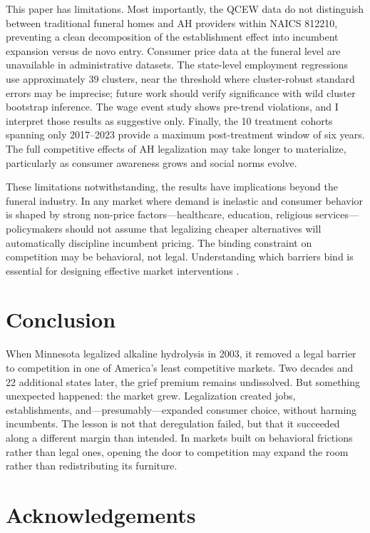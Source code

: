 \documentclass[12pt]{article}
\begin{document}
This paper has limitations. Most importantly, the QCEW data do not distinguish between traditional funeral homes and AH providers within NAICS 812210, preventing a clean decomposition of the establishment effect into incumbent expansion versus de novo entry. Consumer price data at the funeral level are unavailable in administrative datasets. The state-level employment regressions use approximately 39 clusters, near the threshold where cluster-robust standard errors may be imprecise; future work should verify significance with wild cluster bootstrap inference. The wage event study shows pre-trend violations, and I interpret those results as suggestive only. Finally, the 10 treatment cohorts spanning only 2017--2023 provide a maximum post-treatment window of six years. The full competitive effects of AH legalization may take longer to materialize, particularly as consumer awareness grows and social norms evolve.

These limitations notwithstanding, the results have implications beyond the funeral industry. In any market where demand is inelastic and consumer behavior is shaped by strong non-price factors---healthcare, education, religious services---policymakers should not assume that legalizing cheaper alternatives will automatically discipline incumbent pricing. The binding constraint on competition may be behavioral, not legal. Understanding which barriers bind is essential for designing effective market interventions \citep{stigler1971theory, hsieh2009misallocation}.


\section{Conclusion}

When Minnesota legalized alkaline hydrolysis in 2003, it removed a legal barrier to competition in one of America's least competitive markets. Two decades and 22 additional states later, the grief premium remains undissolved. But something unexpected happened: the market grew. Legalization created jobs, establishments, and---presumably---expanded consumer choice, without harming incumbents. The lesson is not that deregulation failed, but that it succeeded along a different margin than intended. In markets built on behavioral frictions rather than legal ones, opening the door to competition may expand the room rather than redistributing its furniture.

\section*{Acknowledgements}
\end{document}
